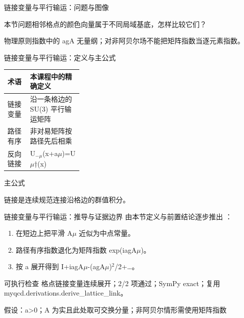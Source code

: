 \begin{frame}[t]{链接变量与平行输运：问题与图像}
\footnotesize
\begin{block}{本节问题}相邻格点的颜色向量属于不同局域基底，怎样比较它们？\end{block}
\begin{block}{物理原则}\quad 指数中的 agA 无量纲；对非阿贝尔场不能把矩阵指数当逐元素指数。\end{block}
\end{frame}

\begin{frame}[t]{链接变量与平行输运：定义与主公式}
\footnotesize\begin{tabularx}{\linewidth}{p{0.30\linewidth}Y}
\toprule 术语 & 本课程中的精确定义\\\midrule
{} 链接变量 & 沿一条格边的 SU(3) 平行输运矩阵\\
 路径有序 & 非对易矩阵按路径先后相乘\\
 反向链接 & U\ensuremath{_{-\mu}}(x+a\ensuremath{\mu})=U\ensuremath{\mu}†(x)\\
\bottomrule\end{tabularx}\vspace{0.15cm}
\begin{block}{ 主公式}\centering{}\end{block}
链接是连续规范连接沿格边的群值积分。
\end{frame}

\begin{frame}[t]{链接变量与平行输运：推导与证据边界}
\footnotesize
{}\quad 由本节定义与前置结论逐步推出 ：
\begin{enumerate}
\item 在短边上把平滑 A\ensuremath{\mu} 近似为中点常量。
\item 路径有序指数退化为矩阵指数 exp(iagA\ensuremath{\mu})。
\item 按 a 展开得到 I+iagA\ensuremath{\mu}-(agA\ensuremath{\mu})\ensuremath{^{2}}/\allowbreak{}2+…。
\end{enumerate}\begin{block}{可执行检查}
\quad 格点链接变量连续展开；2/2 项通过；SymPy exact；复用 myqcd.derivations.derive\_lattice\_link。
\par\scriptsize 假设：a>0；A 为实且此处取可交换分量；非阿贝尔情形需使用矩阵指数
\end{block}
\end{frame}

